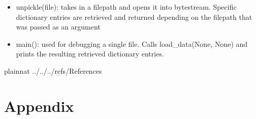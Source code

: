 \documentclass[12pt, titlepage]{article}
\begin{document}
\begin{itemize}
	\item{unpickle(file): takes in a filepath and opens it into bytestream. Specific dictionary entries are retrieved and returned depending on the filepath that was passed as an argument}
	
	\item{main(): used for debugging a single file. Calls load\_data(None, None) and prints the resulting retrieved dictionary entries. }
\end{itemize}

\newpage

 {plainnat}
 {../../../refs/References}

\newpage

\section{Appendix} \label{Appendix}

\end{document}
